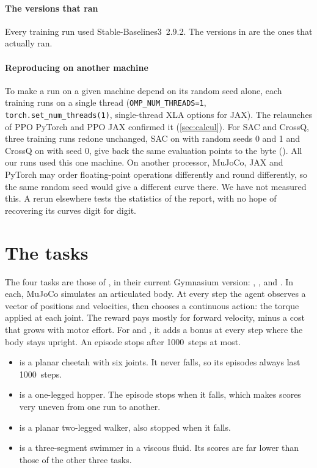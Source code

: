 \paragraph{The versions that ran}
Every training run used Stable-Baselines3~2.9.2. The versions in  are the ones that
actually ran.

\paragraph{Reproducing on another machine}
To make a run on a given machine depend on its random seed alone, each training runs on a single thread
(\texttt{OMP\_NUM\_THREADS=1}, \texttt{torch.set\_num\_threads(1)}, single-thread XLA options for JAX). The
relaunches of PPO PyTorch and PPO JAX confirmed it (\cref{sec:calcul}). For SAC and CrossQ, three training runs
redone unchanged, SAC on  with random seeds 0 and 1 and CrossQ on  with seed 0, give
back the same evaluation points to the byte (). All our runs used this
one machine. On another processor, MuJoCo, JAX and PyTorch may order floating-point operations differently and
round differently, so the same random seed would give a different curve there. We have not measured this. A
rerun elsewhere tests the statistics of the report, with no hope of recovering its curves digit for digit.

\section{The tasks}\label{sec:taches}

The four tasks are those of \textcite{henderson2018matters}, in their current Gymnasium version:
, ,  and . In each, MuJoCo simulates
an articulated body. At every step the agent observes a vector of positions and velocities, then chooses a
continuous action: the torque applied at each joint. The reward pays mostly for forward velocity, minus a cost
that grows with motor effort. For  and , it adds a bonus at every step where the
body stays upright. An episode stops after \num{1000}~steps at most.
\begin{itemize}
  \item {} is a planar cheetah with six joints. It never falls, so its episodes always last
    \num{1000}~steps.
  \item {} is a one-legged hopper. The episode stops when it falls, which makes scores very uneven
    from one run to another.
  \item {} is a planar two-legged walker, also stopped when it falls.
  \item {} is a three-segment swimmer in a viscous fluid. Its scores are far lower than those of
    the other three tasks.
\end{itemize}

